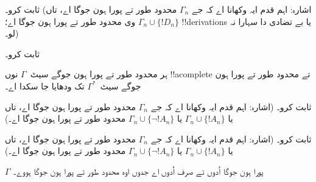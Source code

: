 \documentclass[../../../include/open-logic-section]{subfiles}
\begin{document}
\begin{prob}
ثابت کرو۔ (اشارہ: اہم قدم ایہ وکھانا اے کہ جے
$\Gamma_n$ محدود طور تے پورا ہون جوگا اے،
تاں $\Gamma_n \cup \{!D_n\}$ وی
محدود طور تے پورا ہون جوگا اے؛
!!{derivation}s یا بے تضادی دا سہارا نہ لو۔)
\end{prob}
\tagendprob


\begin{prob}
ثابت کرو۔
\end{prob}
\tagendprob

\begin{lem}
ہر محدود طور تے پورا ہون جوگے
سیٹ~$\Gamma$ نوں !!a{complete} تے
محدود طور تے پورا ہون جوگے
سیٹ~$\Gamma^*$ تک ودھایا جا سکدا اے۔
\end{lem}

\begin{prob}
ثابت کرو۔ (اشارہ: اہم قدم ایہ وکھانا اے
کہ جے $\Gamma_n$ محدود طور تے پورا
ہون جوگا اے، تاں یا
$\Gamma_n \cup \{!A_n\}$ یا
$\Gamma_n \cup \{\lnot !A_n\}$
محدود طور تے پورا ہون جوگا اے۔)
\end{prob}
\tagendprob

\begin{prob}
ثابت کرو۔ (اشارہ: اہم قدم ایہ وکھانا اے
کہ جے $\Gamma_n$ محدود طور تے پورا
ہون جوگا اے، تاں یا
$\Gamma_n \cup \{!A_n\}$ یا
$\Gamma_n \cup \{\lnot !A_n\}$
محدود طور تے پورا ہون جوگا اے۔)
\end{prob}
\tagendprob

\begin{thm}
$\Gamma$ پورا ہون جوگا اُدوں تے
صرف اُدوں اے جدوں اوہ محدود
طور تے پورا ہون جوگا ہووے۔
\end{thm}
\end{document}
